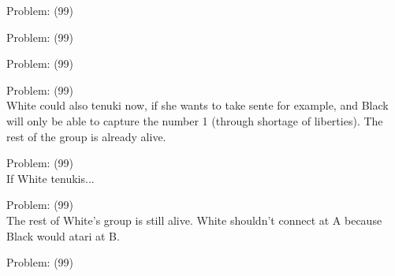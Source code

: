 \documentclass[11pt]{article}
\begin{document}
\begin{minipage}[t]{0.5\textwidth}
  {\centering
  
  Problem: (99)\\
  
  }
\end{minipage}
\begin{minipage}[t]{0.5\textwidth}
  {\centering
  
  Problem: (99)\\
  
  }
\end{minipage}
\begin{minipage}[t]{0.5\textwidth}
  {\centering
  
  Problem: (99)\\
  
  }
\end{minipage}
\begin{minipage}[t]{0.5\textwidth}
  {\centering
  
  Problem: (99)\\
  White could also tenuki now, if she wants to take sente for example, and Black will only be able to capture the number 1 (through shortage of liberties). The rest of the group is already alive.\\
  }
\end{minipage}
\begin{minipage}[t]{0.5\textwidth}
  {\centering
  
  Problem: (99)\\
  If White tenukis...\\
  }
\end{minipage}
\begin{minipage}[t]{0.5\textwidth}
  {\centering
  
  Problem: (99)\\
  The rest of White's group is still alive. White shouldn't connect at A because Black would atari at B.\\
  }
\end{minipage}
\begin{minipage}[t]{0.5\textwidth}
  {\centering
  
  Problem: (99)\\
  
  }
\end{minipage}
\end{document}
